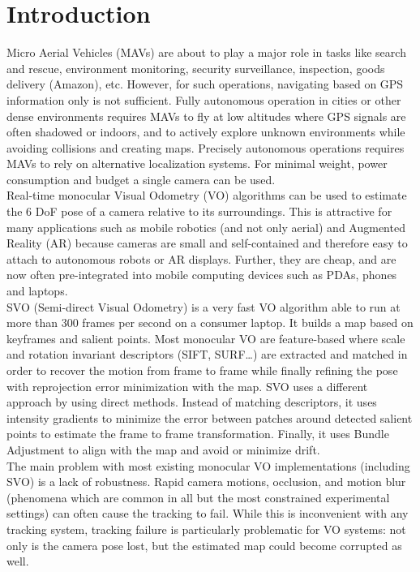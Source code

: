 \chapter{Introduction}\label{sec:introduction}

Micro Aerial Vehicles (MAVs) are about to play a major role in tasks like search and rescue, environment monitoring, security surveillance, inspection, goods delivery (Amazon), etc.  However, for such operations, navigating based on GPS information only is not sufficient. Fully autonomous operation in cities or other dense environments requires MAVs to fly at low altitudes where GPS signals are often shadowed or indoors, and to actively explore unknown environments while avoiding collisions and creating maps. Precisely autonomous operations requires MAVs to rely on alternative localization systems. For minimal weight, power consumption and budget a single camera can be used.\\

Real-time monocular Visual Odometry (VO) algorithms can be used to estimate the 6 DoF pose of a camera relative to its surroundings. This is attractive for many applications such as mobile robotics (and not only aerial) and Augmented Reality (AR) because cameras are small and self-contained and therefore easy to attach to autonomous robots or AR displays. Further, they are cheap, and are now often pre-integrated into mobile computing devices such as PDAs, phones and laptops.\\

SVO (Semi-direct Visual Odometry) \cite{Forster2014} is a very fast VO algorithm able to run at more than 300 frames per second on a consumer laptop. It builds a map based on keyframes and salient points. Most monocular VO are feature-based where scale and rotation invariant descriptors (SIFT, SURF\ldots) are extracted and matched in order to recover the motion from frame to frame while finally refining the pose with reprojection error minimization with the map. SVO uses a different approach by using direct methods. Instead of matching descriptors, it uses intensity gradients to minimize the error between patches around detected salient points to estimate the frame to frame transformation. Finally, it uses Bundle Adjustment to align with the map and avoid or minimize drift.\\

The main problem with most existing monocular VO implementations (including SVO) is a lack of robustness. Rapid camera motions, occlusion, and motion blur (phenomena which are common in all but the most constrained experimental settings) can often cause the tracking to fail. While this is inconvenient with any tracking system, tracking failure is particularly problematic for VO systems: not only is the camera pose lost, but the estimated map could become corrupted as well. \\

